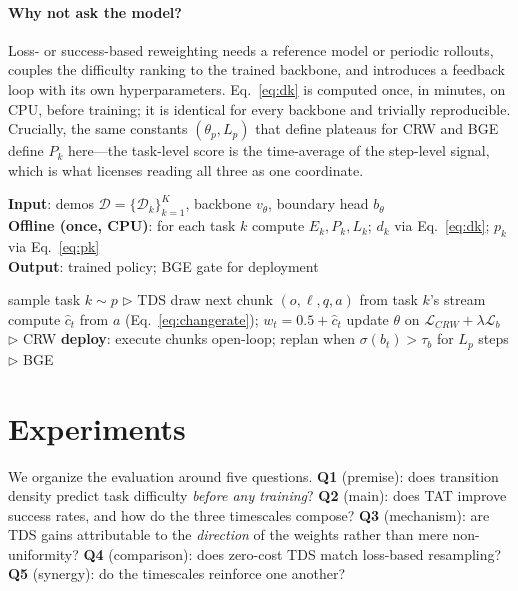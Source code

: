 \documentclass[letterpaper]{article} %
\newcommand{\method}{TAT} %
\newcommand{\crw}{CRW}    %
\newcommand{\bge}{BGE}    %
\newcommand{\tds}{TDS}    %
\begin{document}
\paragraph{Why not ask the model?}
Loss- or success-based reweighting needs a reference model or periodic rollouts, couples the difficulty ranking to the trained backbone, and introduces a feedback loop with its own hyperparameters. Eq.~\ref{eq:dk} is computed once, in minutes, on CPU, before training; it is identical for every backbone and trivially reproducible. Crucially, the same constants $(\theta_p, L_p)$ that define plateaus for \crw{} and \bge{} define $P_k$ here---the task-level score is the time-average of the step-level signal, which is what licenses reading all three as one coordinate.

\begin{algorithm}[tb]
\caption{Transition-Aware Training (\method{})}
\label{alg:tat}
\textbf{Input}: demos $\mathcal{D} = \{\mathcal{D}_k\}_{k=1}^{K}$, backbone $v_\theta$, boundary head $b_\theta$\\
\textbf{Offline (once, CPU)}: for each task $k$ compute $E_k, P_k, L_k$; $d_k$ via Eq.~\ref{eq:dk}; $p_k$ via Eq.~\ref{eq:pk}\\
\textbf{Output}: trained policy; \bge{} gate for deployment
\begin{algorithmic}[1]
\STATE sample task $k \sim p$ \hfill $\triangleright$ \tds{}
\STATE draw next chunk $(o, \ell, q, a)$ from task $k$'s stream
\STATE compute $\hat{c}_t$ from $a$ (Eq.~\ref{eq:changerate}); $w_t = 0.5 + \hat{c}_t$
\STATE update $\theta$ on $\mathcal{L}_{\crw{}} + \lambda \mathcal{L}_b$ \hfill $\triangleright$ \crw{}
\ENDWHILE
\STATE \textbf{deploy}: execute chunks open-loop; replan when $\sigma(b_t) > \tau_b$ for $L_p$ steps \hfill $\triangleright$ \bge{}
\end{algorithmic}
\end{algorithm}

\section{Experiments}

We organize the evaluation around five questions.
\textbf{Q1} (premise): does transition density predict task difficulty \emph{before any training}?
\textbf{Q2} (main): does \method{} improve success rates, and how do the three timescales compose?
\textbf{Q3} (mechanism): are \tds{} gains attributable to the \emph{direction} of the weights rather than mere non-uniformity?
\textbf{Q4} (comparison): does zero-cost \tds{} match loss-based resampling?
\textbf{Q5} (synergy): do the timescales reinforce one another?
\end{document}
